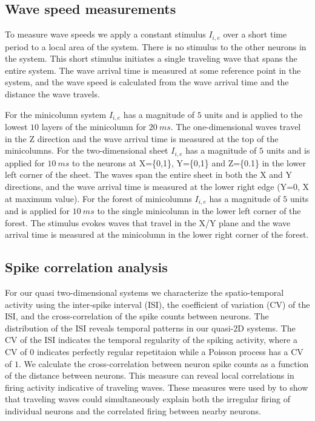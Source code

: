 \documentclass[12pt]{article}
\begin{document}
\subsection{Wave speed measurements}\label{sec:wave_speed_method}
To measure wave speeds we apply a constant stimulus $I_{i,e}$ over a short time period to a local area of the system.
There is no stimulus to the other neurons in the system.
This short stimulus initiates a single traveling wave that spans the entire system.
The wave arrival time is measured at some reference point in the system, and the wave speed is calculated from the wave arrival time and the distance the wave travels.

For the minicolumn system $I_{i,e}$ has a magnitude of $5$ units and is applied to the lowest $10$ layers of the minicolumn for $20~ms$.
The one-dimensional waves travel in the Z direction and the wave arrival time is measured at the top of the minicolumns.
For the two-dimensional sheet $I_{i,e}$ has a magnitude of $5$ units and is applied for $10~ms$ to the neurons at X=\{0,1\}, Y=\{0,1\} and Z=\{0.1\} in the lower left corner of the sheet.
The waves span the entire sheet in both the X and Y directions, and the wave arrival time is measured at the lower right edge (Y=0, X at maximum value). 
For the forest of minicolumns $I_{i,e}$ has a magnitude of $5$ units and is applied for $10~ms$ to the single minicolumn in the lower left corner of the forest.
The stimulus evokes waves that travel in the X/Y plane and the wave arrival time is measured at the minicolumn in the lower right corner of the forest.

\subsection{Spike correlation analysis}\label{sec:spike_correlation_analysis}
For our quasi two-dimensional systems we characterize the spatio-temporal activity using the inter-spike interval (ISI), the coefficient of variation (CV) of the ISI, 
and the cross-correlation of the spike counts between neurons.
The distribution of the ISI reveals temporal patterns in our quasi-2D systems.
The CV of the ISI indicates the temporal regularity of the spiking activity, where a CV of $0$ indicates perfectly regular repetitaion while a Poisson process
has a CV of $1$.
We calculate the cross-correlation between neuron spike counts as a function of the distance between neurons.
This measure can reveal local correlations in firing activity indicative of traveling waves.
These measures were used by \parencite{keane2015} to show that traveling waves could simultaneously explain both the irregular firing of individual neurons
and the correlated firing between nearby neurons.
\end{document}
